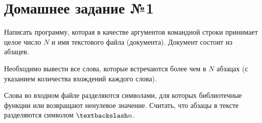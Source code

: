 \section*{Домашнее задание №1}

Написать программу, которая в качестве аргументов командной строки
принимает целое число $N$ и имя текстового файла (документа). Документ
состоит из абзацев.

Необходимо вывести все слова, которые встречаются
более чем в $N$ абзацах (с указанием количества вхождений каждого слова).

Слова во входном файле разделяются символами, для которых
библиотечные функции  или  возвращают ненулевое
значение. Считать, что абзацы в тексте разделяются символом $\textbackslash n$.
